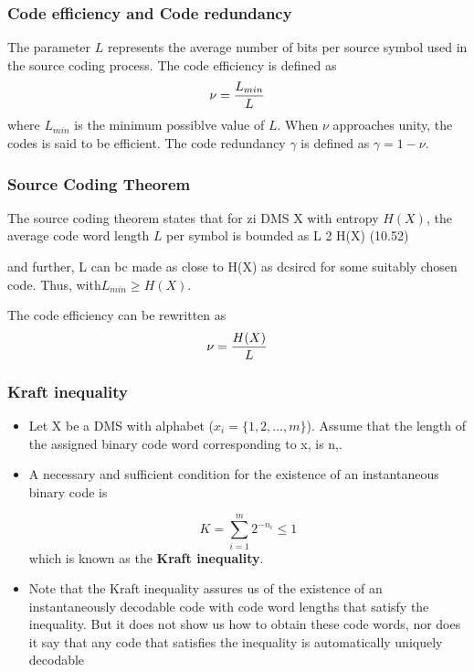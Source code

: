 \documentclass[a4]{beamer}
\begin{document}
\begin{frame}
\frametitle{Code efficiency and Code redundancy}
The parameter $L$ represents the average number of bits per source symbol used in the source coding process.
The code efficiency is defined as \[\nu = {L_{min} \over L} \]where $L_{min}$ is the minimum possiblve value of $L$. When $\nu$ approaches unity, the codes is said to be efficient. 
The code redundancy $\gamma$ is defined as $\gamma = 1- \nu$.
\end{frame}


\begin{frame}
\frametitle{Source Coding Theorem}
The source coding theorem states that for zi DMS X with entropy $H(X)$, the average code word length $L$ per symbol is bounded as
L 2 H(X) (10.52)

and further, L can bc made as close to H(X) as dcsircd for some suitably chosen code.
Thus, with$ L_{min} \geq H(X)$.

The code efficiency can be rewritten as
\[\nu = {H(X) \over L} \]
\end{frame}



\begin{frame}
\frametitle{ Kraft inequality}
\begin{itemize}
\item Let X be a DMS with alphabet ($x _i = \{1, 2, . . . ,m\}$). Assume that the length of the assigned binary
code word corresponding to x, is n,.
\item A necessary and sufficient condition for the existence of an instantaneous binary code is
 
 \[ K = \sum^{m}_{i=1}2^{-n_i} \leq 1 \]
which is known as the \textbf{Kraft inequality}.
\item Note that the Kraft inequality assures us of the existence of an instantaneously decodable code
with code word lengths that satisfy the inequality. But it does not show us how to obtain these code
words, nor does it say that any code that satisfies the inequality is automatically uniquely decodable
\end{itemize}
\end{frame}
\end{document}
